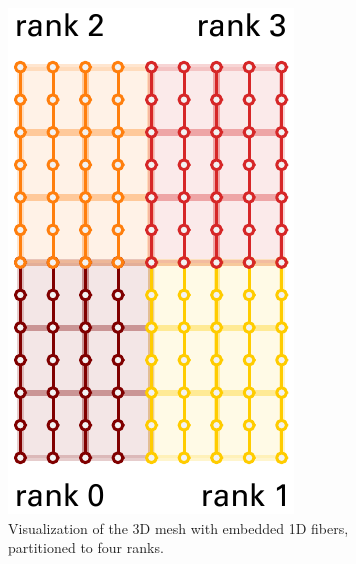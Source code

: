 \begin{figure}%
  \centering%
  \begin{subfigure}[t]{0.30\textwidth}%
    \centering%
    \includegraphics[width=\textwidth]{images/implementation/mesh_structure.pdf}
    \caption{Visualization of the 3D mesh with embedded 1D fibers, partitioned to four ranks.}%
    \label{fig:mesh_structure}%
  \end{subfigure}
  \qquad
  \begin{subfigure}[t]{0.45\textwidth}%

\end{subfigure}
\end{figure}
